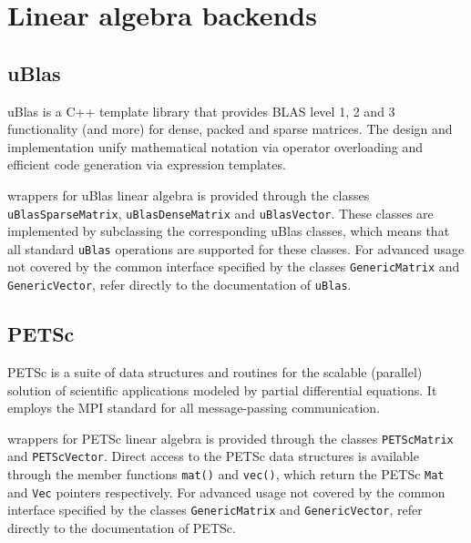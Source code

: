 \section{Linear algebra backends}

\subsection{uBlas}

uBlas is a C++ template library that provides BLAS level 1, 2 and 3
functionality (and more) for dense, packed and sparse matrices.
The design and implementation unify mathematical notation via operator
overloading and efficient code generation via expression templates.

\dolfin{} wrappers for uBlas linear algebra is provided through the
classes \texttt{uBlasSparseMatrix}, \texttt{uBlasDenseMatrix} and
\texttt{uBlasVector}. These classes are implemented by subclassing the
corresponding uBlas classes, which means that all standard
\texttt{uBlas} operations are supported for these classes. For
advanced usage not covered by the common \dolfin{} interface specified
by the classes \texttt{GenericMatrix} and \texttt{GenericVector},
refer directly to the documentation of \texttt{uBlas}.

\subsection{PETSc}

PETSc is a suite of data structures and routines for the scalable
(parallel) solution of scientific applications modeled by partial
differential equations. It employs the MPI standard for all 
message-passing communication.

\dolfin{} wrappers for PETSc linear algebra is provided through the
classes \texttt{PETScMatrix} and \texttt{PETScVector}. Direct access
to the PETSc data structures is available through the member functions
\texttt{mat()} and \texttt{vec()}, which return the PETSc \texttt{Mat}
and \texttt{Vec} pointers respectively. For advanced usage not covered
by the common \dolfin{} interface specified by the classes
\texttt{GenericMatrix} and \texttt{GenericVector}, refer directly to
the documentation of PETSc.
